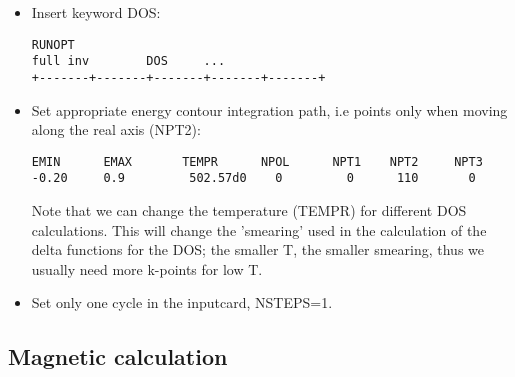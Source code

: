 \documentclass[a4paper,10pt,fullpage]{report}
\begin{document}
\begin{itemize}

\item Insert keyword DOS:
\begin{verbatim}
RUNOPT
full inv        DOS     ...
+-------+-------+-------+-------+-------+
\end{verbatim}

\item Set appropriate energy contour integration path, i.e points only
when moving along the real axis (NPT2):
\begin{verbatim}
EMIN      EMAX       TEMPR      NPOL      NPT1    NPT2     NPT3
-0.20     0.9         502.57d0    0         0      110       0
\end{verbatim}
Note that we can change the temperature (TEMPR) for different DOS calculations.
This will change the 'smearing' used in the calculation of the delta functions
for the DOS; the smaller T, the smaller smearing, thus we usually need more
k-points for low T.  

\item Set only one cycle in the inputcard, NSTEPS=1.

\end{itemize}


\subsection{Magnetic calculation}
\end{document}
